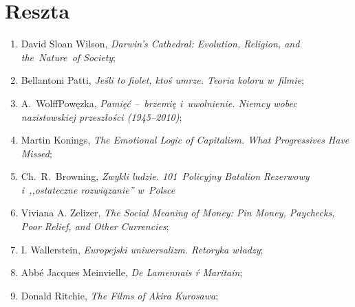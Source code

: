 \documentclass[a4paper,11pt]{article}
\begin{document}
\newpage
\section{Reszta}

\vspace{\spaceTwo}


\begin{enumerate}
\item David Sloan Wilson, \emph{Darwin's Cathedral: Evolution,
    Religion, and the~Nature~of Society};
\item Bellantoni Patti, \emph{Jeśli to fiolet, ktoś umrze. Teoria
    koloru w~filmie};
\item A.~Wolff\dywiz Powęzka, \emph{Pamięć --~brzemię i~uwolnienie.
    Niemcy wobec nazistowskiej przeszłości (1945--2010)};
\item Martin Konings, \emph{The Emotional Logic of Capitalism. What
    Progressives Have Missed};
\item Ch.~R.~Browning, \emph{Zwykli ludzie. 101~Policyjny Batalion
    Rezerwowy i~,,ostateczne rozwiązanie'' w~Polsce}
\item Viviana A. Zelizer, \emph{The Social Meaning of Money: Pin
    Money, Paychecks, Poor Relief, and Other Currencies};
\item I. Wallerstein, \emph{Europejski uniwersalizm. Retoryka władzy};
\item Abbé Jacques Meinvielle, \emph{De Lamennais ŕ Maritain};
\item Donald Ritchie, \emph{The Films of Akira Kurosawa};
\end{enumerate}




\end{document}
